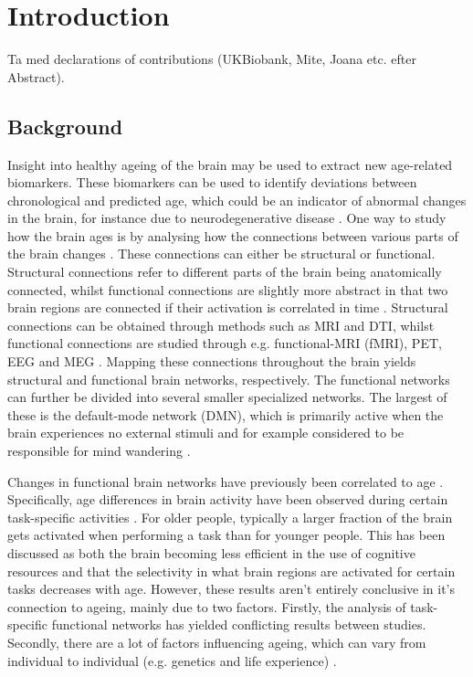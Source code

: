 \chapter{Introduction}

Ta med declarations of contributions (UKBiobank, Mite, Joana etc. efter Abstract).

\section{Background}
Insight into healthy ageing of the brain may be used to extract new age-related biomarkers. These biomarkers can be used to identify deviations between chronological and predicted age, which could be an indicator of abnormal changes in the brain, for instance due to neurodegenerative disease \cite{multiplex}. One way to study how the brain ages is by analysing how the connections between various parts of the brain changes \cite{grady}. These connections can either be structural or functional. Structural connections refer to different parts of the brain being anatomically connected, whilst functional connections are slightly more abstract in that two brain regions are connected if their activation is correlated in time \cite{sporns}. Structural connections can be obtained through methods such as MRI and DTI, whilst functional connections are studied through e.g. functional-MRI (fMRI), PET, EEG and MEG \cite{hirsch}. Mapping these connections throughout the brain yields structural and functional brain networks, respectively. The functional networks can further be divided into several smaller specialized networks. The largest of these is the default-mode network (DMN), which is primarily active when the brain experiences no external stimuli and for example considered to be responsible for mind wandering \cite{alves_dmn}.

Changes in functional brain networks have previously been correlated to age \cite{grady}. Specifically, age differences in brain activity have been observed during certain task-specific activities \cite{grady}. For older people, typically a larger fraction of the brain gets activated when performing a task than for younger people. This has been discussed as both the brain becoming less efficient in the use of cognitive resources and that the selectivity in what brain regions are activated for certain tasks decreases with age. However, these results aren't entirely conclusive in it's connection to ageing, mainly due to two factors. Firstly, the analysis of task-specific functional networks has yielded conflicting results between studies. Secondly, there are a lot of factors influencing ageing, which can vary from individual to individual (e.g. genetics and life experience) \cite{grady}. 

